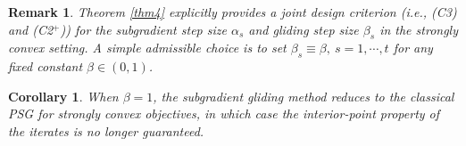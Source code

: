 \documentclass[sn-mathphys]{JORSC-jnl}%
\theoremstyle{thmstyleone}%
\newtheorem{remark}{Remark}[section]%
\newtheorem{corollary}{Corollary}[section]%
\theoremstyle{thmstylethree}%
\begin{document}
	
	\begin{remark}
		Theorem \ref{thm4} explicitly provides a joint design criterion (i.e., (C3) and (C2$^+$)) for the subgradient step size $\alpha_s$ and gliding step size $\beta_s$ in the strongly convex setting. A simple admissible choice is to set $\beta_s\equiv \beta, ~s=1,\cdots,t$ for any fixed constant $\beta \in (0,1)$.
	\end{remark}
	
	\begin{corollary}\label{PSG_special2}
		When $\beta = 1$, the subgradient gliding method reduces to the classical PSG for strongly convex objectives, in which case the interior-point property of the iterates is no longer guaranteed.
	\end{corollary}
	
\end{document}

